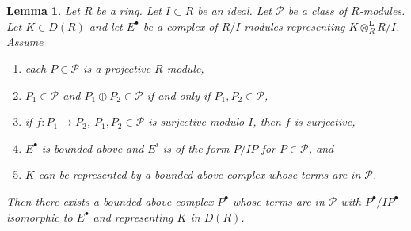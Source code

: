 \documentclass{amsart}
\theoremstyle{plain}
\newtheorem{lemma}[subsection]{Lemma}
\theoremstyle{definition}
\theoremstyle{remark}
\numberwithin{equation}{subsection}
\begin{document}
\begin{lemma}
\label{lemma-lift-complex}
Let $R$ be a ring. Let $I \subset R$ be an ideal. Let $\mathcal{P}$
be a class of $R$-modules.
Let $K \in D(R)$ and let $E^\bullet$ be a complex of $R/I$-modules
representing $K \otimes_R^\mathbf{L} R/I$. Assume
\begin{enumerate}
\item each $P \in \mathcal{P}$ is a projective $R$-module,
\item $P_1 \in \mathcal{P}$ and $P_1 \oplus P_2 \in \mathcal{P}$
if and only if $P_1, P_2 \in \mathcal{P}$,
\item if $f : P_1 \to P_2$, $P_1, P_2 \in \mathcal{P}$ is surjective
modulo $I$, then $f$ is surjective,
\item $E^\bullet$ is bounded above and $E^i$ is of the form $P/IP$
for $P \in \mathcal{P}$, and
\item $K$ can be represented by a bounded above complex
whose terms are in $\mathcal{P}$.
\end{enumerate}
Then there exists a bounded above complex $P^\bullet$ whose terms
are in $\mathcal{P}$ with $P^\bullet/IP^\bullet$ isomorphic to
$E^\bullet$ and representing $K$ in $D(R)$.
\end{lemma}
\end{document}

